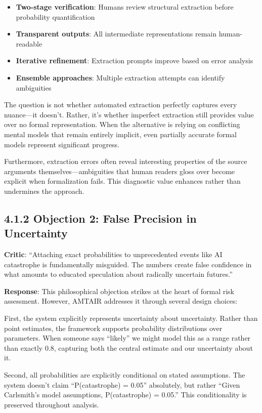 \documentclass[
  11pt,
  letterpaper,
]{book}
\providecommand{\tightlist}{%
  \setlength{\itemsep}{0pt}\setlength{\parskip}{0pt}}
\begin{document}
\begin{itemize}
\tightlist
\item
  \textbf{Two-stage verification}: Humans review structural extraction
  before probability quantification
\item
  \textbf{Transparent outputs}: All intermediate representations remain
  human-readable
\item
  \textbf{Iterative refinement}: Extraction prompts improve based on
  error analysis
\item
  \textbf{Ensemble approaches}: Multiple extraction attempts can
  identify ambiguities
\end{itemize}

The question is not whether automated extraction perfectly captures
every nuance---it doesn't. Rather, it's whether imperfect extraction
still provides value over no formal representation. When the alternative
is relying on conflicting mental models that remain entirely implicit,
even partially accurate formal models represent significant progress.

Furthermore, extraction errors often reveal interesting properties of
the source arguments themselves---ambiguities that human readers gloss
over become explicit when formalization fails. This diagnostic value
enhances rather than undermines the approach.

\subsection{4.1.2 Objection 2: False Precision in
Uncertainty}\label{sec-false-precision}

\textbf{Critic}: ``Attaching exact probabilities to unprecedented events
like AI catastrophe is fundamentally misguided. The numbers create false
confidence in what amounts to educated speculation about radically
uncertain futures.''

\textbf{Response}: This philosophical objection strikes at the heart of
formal risk assessment. However, AMTAIR addresses it through several
design choices:

First, the system explicitly represents uncertainty about uncertainty.
Rather than point estimates, the framework supports probability
distributions over parameters. When someone says ``likely'' we might
model this as a range rather than exactly 0.8, capturing both the
central estimate and our uncertainty about it.

Second, all probabilities are explicitly conditional on stated
assumptions. The system doesn't claim ``P(catastrophe) = 0.05''
absolutely, but rather ``Given Carlsmith's model assumptions,
P(catastrophe) = 0.05.'' This conditionality is preserved throughout
analysis.
\end{document}
